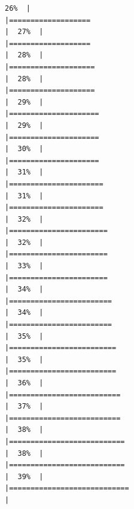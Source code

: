 \documentclass[
  english,
  man,a4paper,mask,floatsintext]{apa6}
\begin{document}
\begin{verbatim}
26%  |                                                                              |===================                                                   |  27%  |                                                                              |===================                                                   |  28%  |                                                                              |====================                                                  |  28%  |                                                                              |====================                                                  |  29%  |                                                                              |=====================                                                 |  29%  |                                                                              |=====================                                                 |  30%  |                                                                              |=====================                                                 |  31%  |                                                                              |======================                                                |  31%  |                                                                              |======================                                                |  32%  |                                                                              |=======================                                               |  32%  |                                                                              |=======================                                               |  33%  |                                                                              |=======================                                               |  34%  |                                                                              |========================                                              |  34%  |                                                                              |========================                                              |  35%  |                                                                              |=========================                                             |  35%  |                                                                              |=========================                                             |  36%  |                                                                              |==========================                                            |  37%  |                                                                              |==========================                                            |  38%  |                                                                              |===========================                                           |  38%  |                                                                              |===========================                                           |  39%  |                                                                              |============================                                          |  
\end{verbatim}
\end{document}
